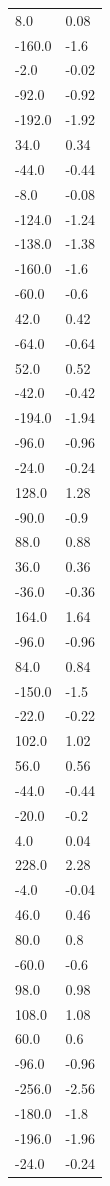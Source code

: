 \begin{longtable}{ll}
8.0 & 0.08 \\
-160.0 & -1.6 \\
-2.0 & -0.02 \\
-92.0 & -0.92 \\
-192.0 & -1.92 \\
34.0 & 0.34 \\
-44.0 & -0.44 \\
-8.0 & -0.08 \\
-124.0 & -1.24 \\
-138.0 & -1.38 \\
-160.0 & -1.6 \\
-60.0 & -0.6 \\
42.0 & 0.42 \\
-64.0 & -0.64 \\
52.0 & 0.52 \\
-42.0 & -0.42 \\
-194.0 & -1.94 \\
-96.0 & -0.96 \\
-24.0 & -0.24 \\
128.0 & 1.28 \\
-90.0 & -0.9 \\
88.0 & 0.88 \\
36.0 & 0.36 \\
-36.0 & -0.36 \\
164.0 & 1.64 \\
-96.0 & -0.96 \\
84.0 & 0.84 \\
-150.0 & -1.5 \\
-22.0 & -0.22 \\
102.0 & 1.02 \\
56.0 & 0.56 \\
-44.0 & -0.44 \\
-20.0 & -0.2 \\
4.0 & 0.04 \\
228.0 & 2.28 \\
-4.0 & -0.04 \\
46.0 & 0.46 \\
80.0 & 0.8 \\
-60.0 & -0.6 \\
98.0 & 0.98 \\
108.0 & 1.08 \\
60.0 & 0.6 \\
-96.0 & -0.96 \\
-256.0 & -2.56 \\
-180.0 & -1.8 \\
-196.0 & -1.96 \\
-24.0 & -0.24 \\

\end{longtable}
